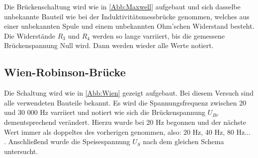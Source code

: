 Die Brückenschaltung wird wie in \autoref{Abb:Maxwell} aufgebaut und sich dasselbe unbekannte Bauteil wie bei der Induktivitätsmessbrücke genommen,
welches aus einer unbekannten Spule und einem unbekannten Ohm'schen Widerstand besteht. Die Widerstände $R_3$ und $R_4$ werden so lange varriiert, 
bis die gemessene Brückenspannung Null wird. Dann werden wieder alle Werte notiert.

\subsection{Wien-Robinson-Brücke}

Die Schaltung wird wie in \autoref{Abb:Wien} gezeigt aufgebaut. Bei diesem Versuch sind alle verwendeten Bauteile bekannt. Es wird die Spannungsfrequenz 
zwischen 20 und 30 000 Hz varriiert und notiert wie sich die Brückenspannung $U_{Br}$ dementsprechend verändert. Hierzu wurde bei 20 Hz begonnen und der
nächste Wert immer als doppeltes des vorherigen genommen, also: 20 Hz, 40 Hz, 80 Hz... . Anschließend wurde die Speisespannung $U_S$ nach dem gleichen Schema untersucht.

\newpage